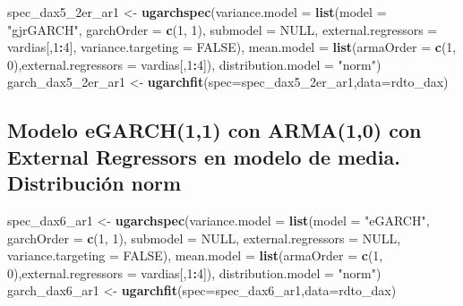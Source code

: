\documentclass[
  11pt,
]{article}
\newenvironment{Shaded}{\begin{snugshade}}{\end{snugshade}}
\newcommand{\DataTypeTok}[1]{\textcolor[rgb]{0.13,0.29,0.53}{#1}}
\newcommand{\DecValTok}[1]{\textcolor[rgb]{0.00,0.00,0.81}{#1}}
\newcommand{\KeywordTok}[1]{\textcolor[rgb]{0.13,0.29,0.53}{\textbf{#1}}}
\newcommand{\NormalTok}[1]{#1}
\newcommand{\OperatorTok}[1]{\textcolor[rgb]{0.81,0.36,0.00}{\textbf{#1}}}
\newcommand{\OtherTok}[1]{\textcolor[rgb]{0.56,0.35,0.01}{#1}}
\newcommand{\StringTok}[1]{\textcolor[rgb]{0.31,0.60,0.02}{#1}}
\begin{document}
\begin{Shaded}
\begin{Highlighting}[]
\NormalTok{spec_dax5_2er_ar1 <-}\StringTok{ }\KeywordTok{ugarchspec}\NormalTok{(}\DataTypeTok{variance.model =} \KeywordTok{list}\NormalTok{(}\DataTypeTok{model =} \StringTok{"gjrGARCH"}\NormalTok{, }\DataTypeTok{garchOrder =} \KeywordTok{c}\NormalTok{(}\DecValTok{1}\NormalTok{, }\DecValTok{1}\NormalTok{), }
                    \DataTypeTok{submodel =} \OtherTok{NULL}\NormalTok{, }\DataTypeTok{external.regressors =}\NormalTok{ vardias[,}\DecValTok{1}\OperatorTok{:}\DecValTok{4}\NormalTok{], }\DataTypeTok{variance.targeting =} \OtherTok{FALSE}\NormalTok{), }
                    \DataTypeTok{mean.model =} \KeywordTok{list}\NormalTok{(}\DataTypeTok{armaOrder =} \KeywordTok{c}\NormalTok{(}\DecValTok{1}\NormalTok{, }\DecValTok{0}\NormalTok{),}\DataTypeTok{external.regressors =}\NormalTok{ vardias[,}\DecValTok{1}\OperatorTok{:}\DecValTok{4}\NormalTok{]),}
               \DataTypeTok{distribution.model =} \StringTok{"norm"}\NormalTok{)}
\NormalTok{garch_dax5_2er_ar1 <-}\StringTok{ }\KeywordTok{ugarchfit}\NormalTok{(}\DataTypeTok{spec=}\NormalTok{spec_dax5_2er_ar1,}\DataTypeTok{data=}\NormalTok{rdto_dax)}
\end{Highlighting}
\end{Shaded}

\hypertarget{modelo-egarch11-con-arma10-con-external-regressors-en-modelo-de-media.-distribuciuxf3n-norm}{%
\subsection{Modelo eGARCH(1,1) con ARMA(1,0) con External Regressors en
modelo de media. Distribución
norm}\label{modelo-egarch11-con-arma10-con-external-regressors-en-modelo-de-media.-distribuciuxf3n-norm}}

\begin{Shaded}
\begin{Highlighting}[]
\NormalTok{spec_dax6_ar1 <-}\StringTok{ }\KeywordTok{ugarchspec}\NormalTok{(}\DataTypeTok{variance.model =} \KeywordTok{list}\NormalTok{(}\DataTypeTok{model =} \StringTok{"eGARCH"}\NormalTok{, }\DataTypeTok{garchOrder =} \KeywordTok{c}\NormalTok{(}\DecValTok{1}\NormalTok{, }\DecValTok{1}\NormalTok{), }
                    \DataTypeTok{submodel =} \OtherTok{NULL}\NormalTok{, }\DataTypeTok{external.regressors =} \OtherTok{NULL}\NormalTok{, }\DataTypeTok{variance.targeting =} \OtherTok{FALSE}\NormalTok{), }
                    \DataTypeTok{mean.model =} \KeywordTok{list}\NormalTok{(}\DataTypeTok{armaOrder =} \KeywordTok{c}\NormalTok{(}\DecValTok{1}\NormalTok{, }\DecValTok{0}\NormalTok{),}\DataTypeTok{external.regressors =}\NormalTok{ vardias[,}\DecValTok{1}\OperatorTok{:}\DecValTok{4}\NormalTok{]),}
               \DataTypeTok{distribution.model =} \StringTok{"norm"}\NormalTok{)}
\NormalTok{garch_dax6_ar1 <-}\StringTok{ }\KeywordTok{ugarchfit}\NormalTok{(}\DataTypeTok{spec=}\NormalTok{spec_dax6_ar1,}\DataTypeTok{data=}\NormalTok{rdto_dax)}
\end{Highlighting}
\end{Shaded}
\end{document}
